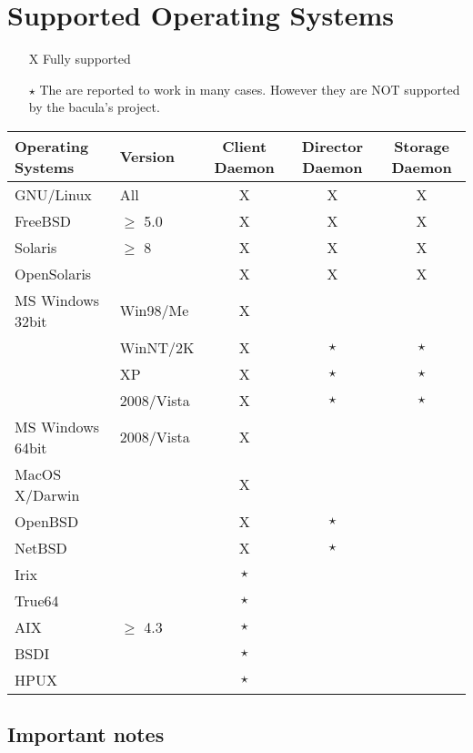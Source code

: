 
\chapter{Supported Operating Systems}
\label{SupportedOSes}

\begin{itemize}
\item[X] Fully supported
\item[$\star$] The are reported to work in many cases.  However they are NOT
  supported by the bacula's project.
\end{itemize}


\begin{tabular}[h]{|l|l|c|c|c|}
  \hline
  Operating Systems & Version & Client \small{Daemon} & Director \small{Daemon} & Storage \small{Daemon} \\
  \hline
  \hline
  GNU/Linux
  & All & X & X & X \\
  \hline
  FreeBSD & $\geq$ 5.0 & X & X & X
  \\
  \hline
  Solaris & $\geq$ 8 & X & X & X \\
  \hline
  OpenSolaris & ~ & X & X & X \\
  \hline
  \hline
  MS Windows 32bit& Win98/Me & X  & ~ & ~ \\
  \hline
  ~ & WinNT/2K & X  & $\star$ & $\star$ \\
  \hline
  ~ & XP & X  & $\star$ & $\star$ \\
  ~ & 2008/Vista & X  & $\star$ & $\star$ \\
  MS Windows 64bit& 2008/Vista & X  & ~ & ~ \\
  \hline
  \hline
  MacOS X/Darwin & ~ & X & ~ & ~ \\
  \hline
  OpenBSD & ~ & X & $\star$ & ~ \\
  \hline
  NetBSD & ~ & X & $\star$ & ~ \\
  \hline
  Irix & ~ & $\star$ & ~ & ~ \\
  \hline
  True64 & ~ & $\star$ & ~ & ~ \\
  \hline
  AIX & $\geq$ 4.3 & $\star$ & ~ & ~ \\
  \hline
  BSDI & ~ & $\star$ & ~ & ~ \\
  \hline
  HPUX & ~ & $\star$ & ~ & ~ \\
  \hline
\end{tabular}

\section*{Important notes}

